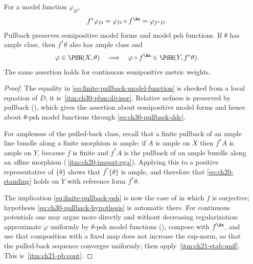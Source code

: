 \begin{proposition}\label{prop:finite-pullback-psh}
For a model function \(\varphi_D\),
\begin{equation}
\label{eq:finite-pullback-model-function}
                  f^*\varphi_D=\varphi_D\circ f^{\An}
                  =\varphi_{f^*D}.
\end{equation}
Pullback preserves semipositive model forms and model psh functions.  If
\(\theta\) has ample class, then \(f^*\theta\) also has ample class and
\begin{equation}
\label{eq:finite-pullback-psh}
 \varphi\in\PSH(X,\theta)
 \quad\Longrightarrow\quad
 \varphi\circ f^{\An}\in\PSH(Y,f^*\theta).
\end{equation}
The same assertion holds for continuous semipositive metric weights.
\end{proposition}

\begin{proof}
The equality in \eqref{eq:finite-pullback-model-function} is checked from a
local equation of \(D\); it is
\,\cref{itm:ch30-pbm:divisor}.
Relative nefness is preserved by pullback
(), which gives the assertion about semipositive
model forms and hence about \(\theta\)-psh model functions through
\eqref{eq:ch30-pullback-ddc}.

For ampleness of the pulled-back class, recall that a finite pullback of an
ample line bundle along a finite morphism is ample: if \(A\) is ample on
\(X\) then \(f^*A\) is ample on \(Y\), because \(f\) is finite and
\(f^*A\) is the pullback of an ample bundle along an affine morphism
(\,\cref{itm:ch20-import:ega}).  Applying this to
a positive representative of \(\{\theta\}\) shows that \(f^*\{\theta\}\) is
ample, and therefore that \eqref{eq:ch20-standing} holds on \(Y\) with
reference form \(f^*\theta\).

The implication \eqref{eq:finite-pullback-psh} is now the case of
 in which \(f\) is surjective; hypothesis
\eqref{eq:ch30-pullback-hypothesis} is automatic there.  For continuous
potentials one may argue more directly and without decreasing
regularization: approximate \(\varphi\) uniformly by \(\theta\)-psh model
functions (), compose with \(f^{\An}\), and
use that composition with a fixed map does not increase the sup-norm, so
that the pulled-back sequence converges uniformly; then apply
\,\cref{itm:ch21-stab:unif}.  This is
\,\cref{itm:ch21-pb:cont}.
\end{proof}

